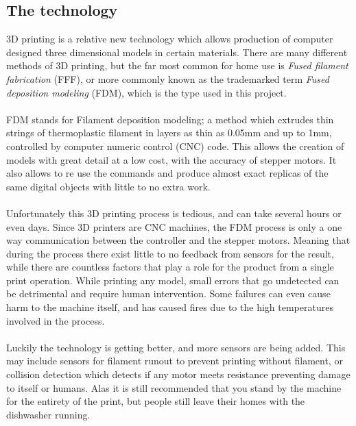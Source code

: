 \documentclass[a4paper, 12pt]{article}
\newcommand{\mysubsection}[1]{\subsection*{#1} \addcontentsline{toc}{subsection}{#1}}
\begin{document}
    \mysubsection{The technology}
    3D printing is a relative new technology which allows production of computer designed three dimensional models
    in certain materials.
    There are many different methods of 3D printing, but the far most common for home use is \textit{Fused filament
    fabrication} (FFF), or more commonly known as the trademarked term \textit{Fused deposition modeling} (FDM),
    which is the type used in this project.
    \\\\
    FDM stands for Filament deposition modeling;
    a method which extrudes thin strings of thermoplastic filament
    in layers as thin as 0.05mm and up to 1mm, controlled by computer numeric control (CNC) code.
    This allows the creation of models with great detail at a low cost, with the accuracy of stepper motors.
    It also allows to re use the commands and produce almost exact replicas of the same digital objects with
    little to no extra work.
    \\\\
    Unfortunately this 3D printing process is tedious, and can take several hours or even days.
    Since 3D printers are CNC machines, the FDM process is only a one way communication between the controller
    and the stepper motors.
    Meaning that during the process there exist little to no feedback from sensors for the result, while there are countless
    factors that play a role for the product from a single print operation.
    While printing any model, small errors that go undetected can be detrimental and require human intervention.
    Some failures can even cause harm to the machine itself, and has caused fires due to the high temperatures involved in
    the process.
    \\\\
    Luckily the technology is getting better, and more sensors are being added.
    This may include sensors for filament runout to prevent printing without filament, or collision detection which detects
    if any motor meets resistance preventing damage to itself or humans.
    Alas it is still recommended that you stand by the machine for the entirety of the print, but people still leave their
    homes with the dishwasher running.
\end{document}
